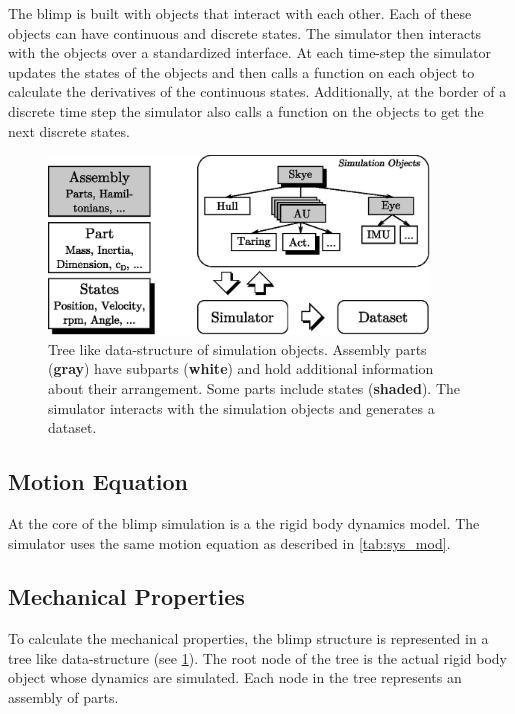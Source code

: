 The blimp is built with objects that interact with each other.
Each of these objects can have continuous and discrete states.
The simulator then interacts with the objects over a standardized interface.
At each time-step the simulator updates the states of the objects and then calls a function on each object to calculate the derivatives of the continuous states.
Additionally, at the border of a discrete time step the simulator also calls a function on the objects to get the next discrete states.

\begin{figure}[htbp]
\centering
\includegraphics[width=0.9\textwidth]{images/sim/sim_tree.eps}
\caption{Tree like data-structure of simulation objects. Assembly parts (\textbf{gray}) have subparts (\textbf{white}) and hold additional information about their arrangement. Some parts include states (\textbf{shaded}). The simulator interacts with the simulation objects and generates a dataset.}
\label{fig:sim_tree}
\end{figure}

\subsection{Motion Equation}
\label{sub:motion_equation}
At the core of the blimp simulation is a the rigid body dynamics model. 
The simulator uses the same motion equation as described in \cref{tab:sys_mod}.

\subsection{Mechanical Properties}
\label{sub:mech_properties}
To calculate the mechanical properties, the blimp structure is represented in a tree like data-structure (see \cref{fig:sim_tree}).
The root node of the tree is the actual rigid body object whose dynamics are simulated.
Each node in the tree represents an assembly of parts. \\

